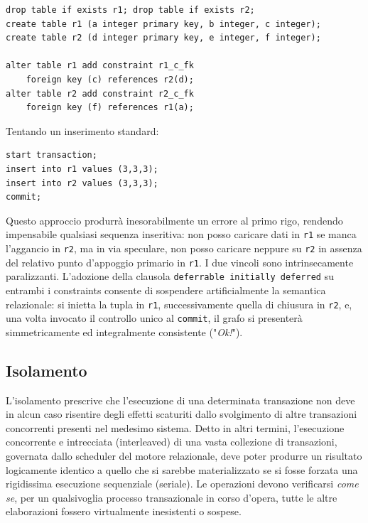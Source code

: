 \begin{verbatim}
drop table if exists r1; drop table if exists r2;
create table r1 (a integer primary key, b integer, c integer);
create table r2 (d integer primary key, e integer, f integer);

alter table r1 add constraint r1_c_fk
    foreign key (c) references r2(d);
alter table r2 add constraint r2_c_fk
    foreign key (f) references r1(a);
\end{verbatim}
Tentando un inserimento standard:
\begin{verbatim}
start transaction;
insert into r1 values (3,3,3);
insert into r2 values (3,3,3);
commit;
\end{verbatim}
Questo approccio produrrà inesorabilmente un errore al primo rigo, rendendo impensabile qualsiasi sequenza inseritiva: non posso caricare dati in \texttt{r1} se manca l'aggancio in \texttt{r2}, ma in via speculare, non posso caricare neppure su \texttt{r2} in assenza del relativo punto d'appoggio primario in \texttt{r1}. I due vincoli sono intrinsecamente paralizzanti.
L'adozione della clausola \texttt{deferrable initially deferred} su entrambi i constraints consente di sospendere artificialmente la semantica relazionale: si inietta la tupla in \texttt{r1}, successivamente quella di chiusura in \texttt{r2}, e, una volta invocato il controllo unico al \texttt{commit}, il grafo si presenterà simmetricamente ed integralmente consistente ("\textit{Ok!}").

\subsection{Isolamento}

L'isolamento prescrive che l'esecuzione di una determinata transazione non deve in alcun caso risentire degli effetti scaturiti dallo svolgimento di altre transazioni concorrenti presenti nel medesimo sistema. Detto in altri termini, l'esecuzione concorrente e intrecciata (interleaved) di una vasta collezione di transazioni, governata dallo scheduler del motore relazionale, deve poter produrre un risultato logicamente identico a quello che si sarebbe materializzato se si fosse forzata una rigidissima esecuzione sequenziale (seriale). Le operazioni devono verificarsi \textit{come se}, per un qualsivoglia processo transazionale in corso d'opera, tutte le altre elaborazioni fossero virtualmente inesistenti o sospese.

